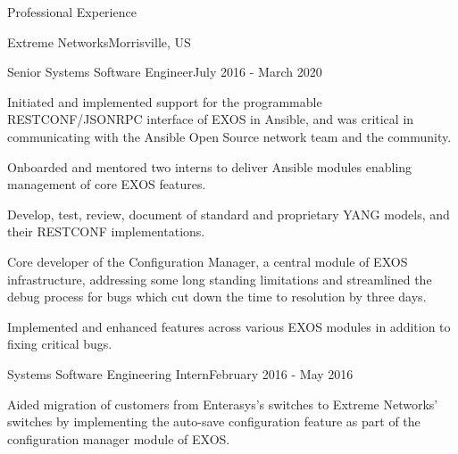 \documentclass{resume} %
\begin{document}
\begin{rSection}{Professional Experience}
\begin{rSubsectionCompany}{Extreme Networks}{Morrisville, US}
    	    \begin{rSubsectionCompanyRole}{Senior Systems Software Engineer}{July 2016 - March 2020} 
    	        \item Initiated and implemented support for the programmable RESTCONF/JSONRPC interface of EXOS in Ansible, and was critical in communicating with the Ansible Open Source network team and the community.
    	        \item Onboarded and mentored two interns to deliver Ansible modules enabling management of core EXOS features.
    	        \item Develop, test, review, document of standard and proprietary YANG models, and their RESTCONF implementations.
    	        \item Core developer of the Configuration Manager, a central module of EXOS infrastructure, addressing some long standing limitations and streamlined the debug process for bugs which cut down the time to resolution by three days.
    	        \item Implemented and enhanced features across various EXOS modules in addition to fixing critical bugs.
    	    \end{rSubsectionCompanyRole}
    	    
    	    \begin{rSubsectionCompanyRole}{Systems Software Engineering Intern}{February 2016 - May 2016}
                \item Aided migration of customers from Enterasys's switches to Extreme Networks' switches by implementing the auto-save configuration feature as part of the configuration manager module of EXOS.
    	    \end{rSubsectionCompanyRole}

            \begin{comment} %
                \item Required skills: Operating systems, Algorithms, C and Python programming, Shell Scripting, Debug tools, Version control system, Computer networking, Linux system architecture.
            \end{comment}
            
    	\end{rSubsectionCompany}
    

\end{rSection}
\end{document}
